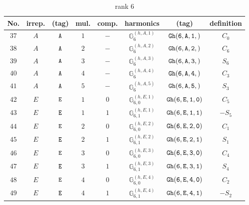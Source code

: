 \documentclass[fleqn,8pt]{jsarticle}
\begin{document}
\begin{table}[ht!]
\begin{center}
\caption{rank 6}
\renewcommand{\arraystretch}{1.3}
\begin{tabular}{cccccccc} \hline \hline
No. & irrep. & (tag) & mul. & comp. & harmonics & (tag) & definition \\ \hline
$ 37 $ & $ A $ & $ {\tt A} $ & $ 1 $ & $ - $ & $ \mathbb{G}_{6}^{(h,A,1)} $ & $ {\tt Gh(6,A,1,)} $ & $ C_{0} $ \\
$ 38 $ & $ A $ & $ {\tt A} $ & $ 2 $ & $ - $ & $ \mathbb{G}_{6}^{(h,A,2)} $ & $ {\tt Gh(6,A,2,)} $ & $ C_{6} $ \\
$ 39 $ & $ A $ & $ {\tt A} $ & $ 3 $ & $ - $ & $ \mathbb{G}_{6}^{(h,A,3)} $ & $ {\tt Gh(6,A,3,)} $ & $ S_{6} $ \\
$ 40 $ & $ A $ & $ {\tt A} $ & $ 4 $ & $ - $ & $ \mathbb{G}_{6}^{(h,A,4)} $ & $ {\tt Gh(6,A,4,)} $ & $ C_{3} $ \\
$ 41 $ & $ A $ & $ {\tt A} $ & $ 5 $ & $ - $ & $ \mathbb{G}_{6}^{(h,A,5)} $ & $ {\tt Gh(6,A,5,)} $ & $ S_{3} $ \\
$ 42 $ & $ E $ & $ {\tt E} $ & $ 1 $ & $ 0 $ & $ \mathbb{G}_{6,0}^{(h,E,1)} $ & $ {\tt Gh(6,E,1,0)} $ & $ C_{5} $ \\
$ 43 $ & $ E $ & $ {\tt E} $ & $ 1 $ & $ 1 $ & $ \mathbb{G}_{6,1}^{(h,E,1)} $ & $ {\tt Gh(6,E,1,1)} $ & $ - S_{5} $ \\
$ 44 $ & $ E $ & $ {\tt E} $ & $ 2 $ & $ 0 $ & $ \mathbb{G}_{6,0}^{(h,E,2)} $ & $ {\tt Gh(6,E,2,0)} $ & $ C_{1} $ \\
$ 45 $ & $ E $ & $ {\tt E} $ & $ 2 $ & $ 1 $ & $ \mathbb{G}_{6,1}^{(h,E,2)} $ & $ {\tt Gh(6,E,2,1)} $ & $ S_{1} $ \\
$ 46 $ & $ E $ & $ {\tt E} $ & $ 3 $ & $ 0 $ & $ \mathbb{G}_{6,0}^{(h,E,3)} $ & $ {\tt Gh(6,E,3,0)} $ & $ C_{4} $ \\
$ 47 $ & $ E $ & $ {\tt E} $ & $ 3 $ & $ 1 $ & $ \mathbb{G}_{6,1}^{(h,E,3)} $ & $ {\tt Gh(6,E,3,1)} $ & $ S_{4} $ \\
$ 48 $ & $ E $ & $ {\tt E} $ & $ 4 $ & $ 0 $ & $ \mathbb{G}_{6,0}^{(h,E,4)} $ & $ {\tt Gh(6,E,4,0)} $ & $ C_{2} $ \\
$ 49 $ & $ E $ & $ {\tt E} $ & $ 4 $ & $ 1 $ & $ \mathbb{G}_{6,1}^{(h,E,4)} $ & $ {\tt Gh(6,E,4,1)} $ & $ - S_{2} $ \\
 \hline \hline
\end{tabular}
\end{center}
\end{table}
\end{document}
